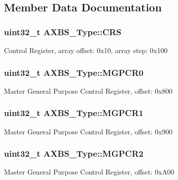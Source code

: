 \subsection{Member Data Documentation}
\subsubsection[{\texorpdfstring{C\+RS}{CRS}}]{ uint32\+\_\+t A\+X\+B\+S\+\_\+\+Type\+::\+C\+RS}\hypertarget{structAXBS__Type_a903f1ae9006bf6e28d76a210abcb5453}{}\label{structAXBS__Type_a903f1ae9006bf6e28d76a210abcb5453}
Control Register, array offset\+: 0x10, array step\+: 0x100 
\subsubsection[{\texorpdfstring{M\+G\+P\+C\+R0}{MGPCR0}}]{ uint32\+\_\+t A\+X\+B\+S\+\_\+\+Type\+::\+M\+G\+P\+C\+R0}\hypertarget{structAXBS__Type_a643715e4038413e9612431b95ddadd9a}{}\label{structAXBS__Type_a643715e4038413e9612431b95ddadd9a}
Master General Purpose Control Register, offset\+: 0x800 
\subsubsection[{\texorpdfstring{M\+G\+P\+C\+R1}{MGPCR1}}]{ uint32\+\_\+t A\+X\+B\+S\+\_\+\+Type\+::\+M\+G\+P\+C\+R1}\hypertarget{structAXBS__Type_afe183bfafdb2d0413e52e10d870f7024}{}\label{structAXBS__Type_afe183bfafdb2d0413e52e10d870f7024}
Master General Purpose Control Register, offset\+: 0x900 
\subsubsection[{\texorpdfstring{M\+G\+P\+C\+R2}{MGPCR2}}]{ uint32\+\_\+t A\+X\+B\+S\+\_\+\+Type\+::\+M\+G\+P\+C\+R2}\hypertarget{structAXBS__Type_aade04fd9f32d87eceee3597d50420f04}{}\label{structAXBS__Type_aade04fd9f32d87eceee3597d50420f04}
Master General Purpose Control Register, offset\+: 0x\+A00 
